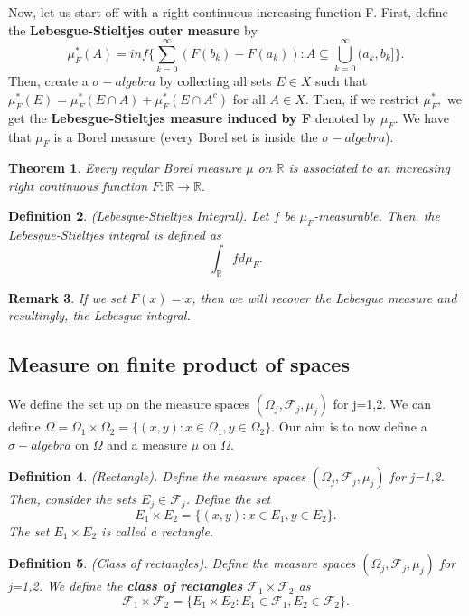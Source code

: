 \documentclass[twoside]{article}
\newcounter{lecnum}
\newtheorem{theorem}{Theorem}[lecnum]
\newtheorem{definition}[theorem]{Definition}
\newtheorem{remark}[theorem]{Remark}
\newcommand{\sigmalgebra}{\mathcal{F}}
\newcommand{\sa}{\sigma-algebra}
\begin{document}
Now, let us start off with a right continuous increasing function F. First, define the \textbf{Lebesgue-Stieltjes outer measure} by 
$$
\mu_{F}^{*}(A) = inf \{\sum_{k=0}^{\infty}(F(b_k) - F(a_k)): A \subseteq \bigcup_{k=0}^{\infty}(a_k,b_k] \}.
$$
Then, create a $\sa$ by collecting all sets $E \in X$ such that $\mu_{F}^{*}(E) = \mu_{F}^{*}(E \cap A) + \mu_{F}^{*}(E \cap A^c)$ for all $A \in X$. Then, if we restrict $\mu_{F}^{*},$ we get the \textbf{Lebesgue-Stieltjes measure induced by F} denoted by $\mu_F.$ We have that $\mu_F$ is a Borel measure (every Borel set is inside the $\sa$).


\begin{theorem}Every regular Borel measure $\mu$ on $\mathbb{R}$ is associated to an increasing right continuous function $F: \mathbb{R} \rightarrow \mathbb{R}.$
\end{theorem}

\begin{definition}(Lebesgue-Stieltjes Integral). Let $f$ be $\mu_F$-measurable. Then, the Lebesgue-Stieltjes integral is defined as 
$$
\int_{\mathbb{R}}fd\mu_F.
$$
\end{definition}

\begin{remark}If we set $F(x) = x$, then we will recover the Lebesgue measure and resultingly, the Lebesgue integral.
\end{remark}

\subsection{Measure on finite product of spaces}

We define the set up on the measure spaces $(\Omega_j, \sigmalgebra_j, \mu_j)$ for j=1,2. We can define $\Omega = \Omega_1 \times \Omega_2 = \{(x,y): x \in \Omega_1, y \in \Omega_2\}$. Our aim is to now define a $\sa$ on $\Omega$ and a measure $\mu$ on $\Omega$.

\begin{definition}(Rectangle). Define the measure spaces $(\Omega_j, \sigmalgebra_j, \mu_j)$ for j=1,2. Then, consider the sets $E_j \in \sigmalgebra_j$. Define the set 
$$
E_1 \times E_2 = \{(x,y): x \in E_1, y \in E_2\}.
$$
The set $E_1 \times E_2$ is called a rectangle.
\end{definition}


\begin{definition}(Class of rectangles). Define the measure spaces $(\Omega_j, \sigmalgebra_j, \mu_j)$ for j=1,2. We define the \textbf{class of rectangles} $\sigmalgebra_1 \times \sigmalgebra_2$ as 
$$
\sigmalgebra_1 \times \sigmalgebra_2 = \{E_1 \times E_2: E_1 \in \sigmalgebra_1, E_2 \in \sigmalgebra_2\}.
$$
\end{definition}
\end{document}
